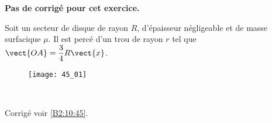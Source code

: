 \normaltrue \difficilefalse \tdifficilefalse
\correctionfalse


\setcounter{question}{0}
\ifcorrection
\else
\textbf{Pas de corrigé pour cet exercice.}
\fi




\ifprof
\else
Soit un secteur de disque de rayon $R$, d'épaisseur négligeable et de masse surfacique $\mu$. Il est percé d'un trou de rayon $r$ tel que $\vect{OA}=\dfrac{3}{4}R\vect{x}$.
\begin{figure}[H]
\centering
\texttt{[image: 45\_01]}
\end{figure}
\fi


\ifprof
\else
\fi

\ifprof ~\\
\else
\fi


\ifprof
\else
\begin{flushright}
\footnotesize{Corrigé voir \ref{B2:10:45}.}
\end{flushright}%
\fi